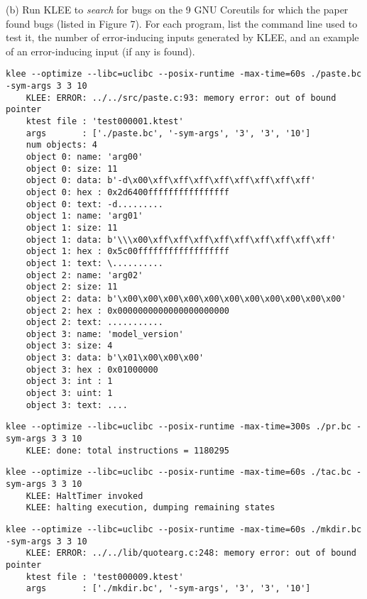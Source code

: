 \documentclass[12pt,letterpaper]{article}
\begin{document}
\noindent (b) Run KLEE to \emph{search} for bugs on the 9 GNU
Coreutils for which the paper found bugs (listed in Figure 7). For
each program, list the command line used to test it, the number of
error-inducing inputs generated by KLEE, and an example of an
error-inducing input (if any is found).
\begin{mdframed}
  \begin{lstlisting}[basicstyle=\tiny]
    klee --optimize --libc=uclibc --posix-runtime -max-time=60s ./paste.bc -sym-args 3 3 10
    KLEE: ERROR: ../../src/paste.c:93: memory error: out of bound pointer
    ktest file : 'test000001.ktest'
    args       : ['./paste.bc', '-sym-args', '3', '3', '10']
    num objects: 4
    object 0: name: 'arg00'
    object 0: size: 11
    object 0: data: b'-d\x00\xff\xff\xff\xff\xff\xff\xff\xff'
    object 0: hex : 0x2d6400ffffffffffffffff
    object 0: text: -d.........
    object 1: name: 'arg01'
    object 1: size: 11
    object 1: data: b'\\\x00\xff\xff\xff\xff\xff\xff\xff\xff\xff'
    object 1: hex : 0x5c00ffffffffffffffffff
    object 1: text: \..........
    object 2: name: 'arg02'
    object 2: size: 11
    object 2: data: b'\x00\x00\x00\x00\x00\x00\x00\x00\x00\x00\x00'
    object 2: hex : 0x0000000000000000000000
    object 2: text: ...........
    object 3: name: 'model_version'
    object 3: size: 4
    object 3: data: b'\x01\x00\x00\x00'
    object 3: hex : 0x01000000
    object 3: int : 1
    object 3: uint: 1
    object 3: text: ....
  \end{lstlisting}
  \begin{lstlisting}[basicstyle=\tiny]
    klee --optimize --libc=uclibc --posix-runtime -max-time=300s ./pr.bc -sym-args 3 3 10
    KLEE: done: total instructions = 1180295
  \end{lstlisting}
  \begin{lstlisting}[basicstyle=\tiny]
    klee --optimize --libc=uclibc --posix-runtime -max-time=60s ./tac.bc -sym-args 3 3 10
    KLEE: HaltTimer invoked
    KLEE: halting execution, dumping remaining states
  \end{lstlisting}
  \begin{lstlisting}[basicstyle=\tiny]
    klee --optimize --libc=uclibc --posix-runtime -max-time=60s ./mkdir.bc -sym-args 3 3 10
    KLEE: ERROR: ../../lib/quotearg.c:248: memory error: out of bound pointer
    ktest file : 'test000009.ktest'
    args       : ['./mkdir.bc', '-sym-args', '3', '3', '10']

\end{lstlisting}
\end{mdframed}
\end{document}
